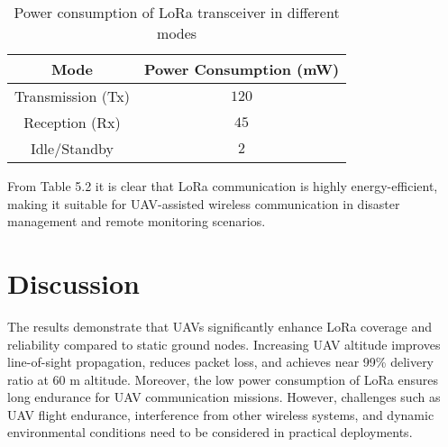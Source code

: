 \begin{table}[htbp]
    \begin{center}
    \begin{tabular}{c|c}
      \hline \textbf{Mode}   &  \textbf{Power Consumption (mW)}\\
      \hline 
      Transmission (Tx) & $120$ \\
      Reception (Rx) & $45$ \\
      Idle/Standby & $2$ \\
      \hline
    \end{tabular}  
    \caption{Power consumption of LoRa transceiver in different modes}
    \end{center}
    \label{tab:power}
\end{table}

From Table 5.2 it is clear that LoRa communication is highly energy-efficient, making it suitable for UAV-assisted wireless communication in disaster management and remote monitoring scenarios.

\section{Discussion}
The results demonstrate that UAVs significantly enhance LoRa coverage and reliability compared to static ground nodes. Increasing UAV altitude improves line-of-sight propagation, reduces packet loss, and achieves near 99\% delivery ratio at 60 m altitude. Moreover, the low power consumption of LoRa ensures long endurance for UAV communication missions. However, challenges such as UAV flight endurance, interference from other wireless systems, and dynamic environmental conditions need to be considered in practical deployments.
